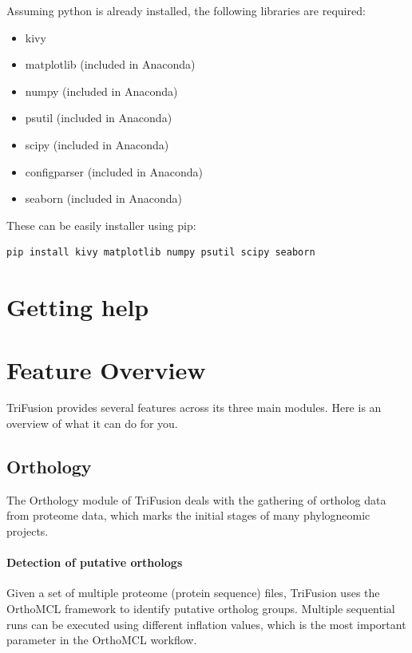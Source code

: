 \documentclass[12pt]{article}
\begin{document}
Assuming python is already installed, the following libraries are required:

\begin{itemize}
\item kivy
\item matplotlib (included in Anaconda)
\item numpy (included in Anaconda)
\item psutil (included in Anaconda)
\item scipy (included in Anaconda)
\item configparser (included in Anaconda)
\item seaborn (included in Anaconda)
\end{itemize}

These can be easily installer using pip:

\begin{verbatim}
pip install kivy matplotlib numpy psutil scipy seaborn
\end{verbatim}


\section{Getting help}


\section{Feature Overview}

TriFusion provides several features across its three main modules. Here is an overview of what it can do for you.

\subsection{Orthology}

The Orthology module of TriFusion deals with the gathering of ortholog data from proteome data, which marks the initial stages of many phylogneomic projects. 

\paragraph{Detection of putative orthologs}

Given a set of multiple proteome (protein sequence) files, TriFusion uses the OrthoMCL framework to identify putative ortholog groups. Multiple sequential runs can be executed using different inflation values, which is the most important parameter in the OrthoMCL workflow.
\end{document}
